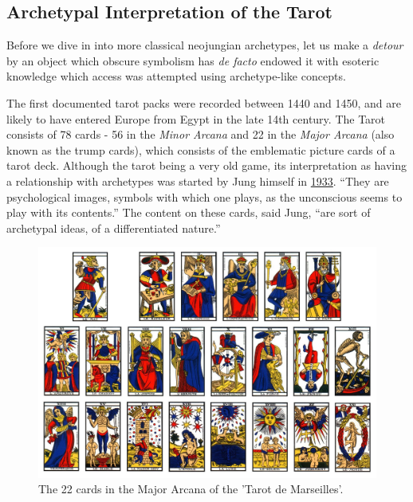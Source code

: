 \documentclass[
]{book}
\begin{document}
\hypertarget{archetypal-interpretation-of-the-tarot}{%
\subsection{Archetypal Interpretation of the Tarot}\label{archetypal-interpretation-of-the-tarot}}

Before we dive in into more classical neojungian archetypes, let us make a \emph{detour} by an object which obscure symbolism has \emph{de facto} endowed it with esoteric knowledge which access was attempted using archetype-like concepts.

The first documented tarot packs were recorded between 1440 and 1450, and are likely to have entered Europe from Egypt in the late 14th century. The Tarot consists of 78 cards - 56 in the \emph{Minor Arcana} and 22 in the \emph{Major Arcana} (also known as the trump cards), which consists of the emblematic picture cards of a tarot deck. Although the tarot being a very old game, its interpretation as having a relationship with archetypes was started by Jung himself in \href{https://marykgreer.com/2008/03/31/carl-jung-and-tarot/}{1933}. ``They are psychological images, symbols with which one plays, as the unconscious seems to play with its contents.'' The content on these cards, said Jung, ``are sort of archetypal ideas, of a differentiated nature.''

\begin{figure}

{\centering \includegraphics[width=\textwidth]{img/tarot} 

}

\caption{The 22 cards in the Major Arcana of the 'Tarot de Marseilles'.}\label{fig:unnamed-chunk-8}
\end{figure}
\end{document}
